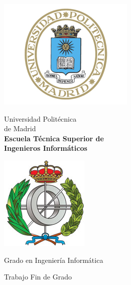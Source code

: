 \begin{titlepage}

\begin{minipage}{0.15\linewidth}
\hspace*{-2.5cm}
\noindent
\includegraphics[scale=0.5]{include/EscUpm.png} \qquad\qquad
\end{minipage}
\begin{minipage}{0.7\linewidth}
\begin{center}
\huge{ Universidad Politécnica\\de Madrid }\\
\vspace*{0.5cm}
\Large{\textbf{Escuela Técnica Superior de \\
Ingenieros Informáticos}}
\end{center}
\end{minipage}
\begin{minipage}{0.2\linewidth}
\includegraphics[scale=0.5]{include/FacInformatica.png} 
\end{minipage}

\vspace*{1cm}
\begin{center}
\Large{Grado en Ingeniería Informática }
\end{center}

\vspace*{1cm}
\begin{center}
\huge{ Trabajo Fin de Grado }
\end{center}


\end{titlepage}
